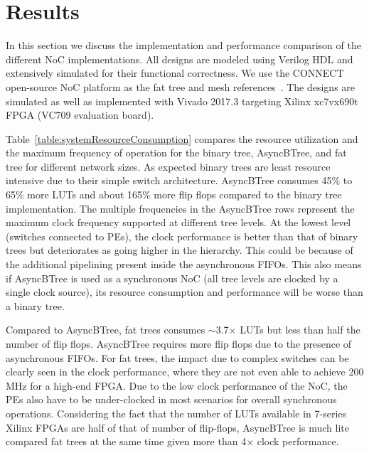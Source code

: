 \section{Results}
\label{sec:result}

In this section we discuss the implementation and performance comparison of the different NoC implementations.
All designs are modeled using Verilog HDL and extensively simulated for their functional correctness.
We use the CONNECT open-source NoC platform as the fat tree and mesh references~\cite{papa_connect_fpga2012}.
The designs are simulated as well as implemented with Vivado 2017.3 targeting Xilinx xc7vx690t FPGA (VC709 evaluation board).


Table~\ref{table:systemResourceConsumption} compares the resource utilization and the maximum frequency of operation for the binary tree, AsyncBTree, and fat tree for different network sizes.
As expected binary trees are least resource intensive due to their simple switch architecture.
AsyncBTree consumes 45\% to 65\% more LUTs and about 165\% more flip flops compared to the binary tree implementation.
The multiple frequencies in the AsyncBTree rows represent the maximum clock frequency supported at different tree levels.
At the lowest level (switches connected to PEs), the clock performance is better than that of binary trees but deteriorates as going higher in the hierarchy.
This could be because of the additional pipelining present inside the asynchronous FIFOs.
This also means if AsyncBTree is used as a synchronous NoC (all tree levels are clocked by a single clock source), its resource consumption and performance will be worse than a binary tree. 

Compared to AsyncBTree, fat trees consumes $\sim$3.7$\times$ LUTs but less than half the number of flip flops.
AsyncBTree requires more flip flops due to the presence of asynchronous FIFOs.
For fat trees, the impact due to complex switches can be clearly seen in the clock performance, where they are not even able to achieve 200 MHz for a high-end FPGA.
Due to the low clock performance of the NoC, the PEs also have to be under-clocked in most scenarios for overall synchronous operations.
Considering the fact that the number of LUTs available in 7-series Xilinx FPGAs are half of that of number of flip-flops, AsyncBTree is much lite compared fat trees at the same time given more than 4$\times$ clock performance.


